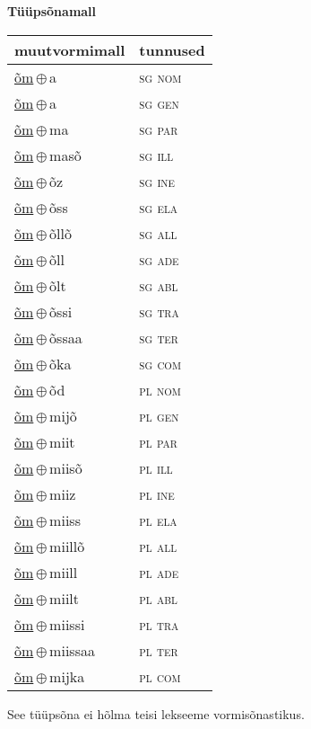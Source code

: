

\vspace{3.5em}
\noindent \begin{minipage}{\textwidth}
\noindent \textbf{Tüüpsõnamall \,}\\

\begin{sideways}
\begin{tabular}{l l}
muutvormimall & tunnused \\
\hline
\underline{õm}\,$\oplus$\,a & \textsc{ sg nom } \\
\underline{õm}\,$\oplus$\,a & \textsc{ sg gen } \\
\underline{õm}\,$\oplus$\,ma & \textsc{ sg par } \\
\underline{õm}\,$\oplus$\,masõ & \textsc{ sg ill } \\
\underline{õm}\,$\oplus$\,õz & \textsc{ sg ine } \\
\underline{õm}\,$\oplus$\,õss & \textsc{ sg ela } \\
\underline{õm}\,$\oplus$\,õllõ & \textsc{ sg all } \\
\underline{õm}\,$\oplus$\,õll & \textsc{ sg ade } \\
\underline{õm}\,$\oplus$\,õlt & \textsc{ sg abl } \\
\underline{õm}\,$\oplus$\,õssi & \textsc{ sg tra } \\
\underline{õm}\,$\oplus$\,õssaa & \textsc{ sg ter } \\
\underline{õm}\,$\oplus$\,õka & \textsc{ sg com } \\
\underline{õm}\,$\oplus$\,õd & \textsc{ pl nom } \\
\underline{õm}\,$\oplus$\,mijõ & \textsc{ pl gen } \\
\underline{õm}\,$\oplus$\,miit & \textsc{ pl par } \\
\underline{õm}\,$\oplus$\,miisõ & \textsc{ pl ill } \\
\underline{õm}\,$\oplus$\,miiz & \textsc{ pl ine } \\
\underline{õm}\,$\oplus$\,miiss & \textsc{ pl ela } \\
\underline{õm}\,$\oplus$\,miillõ & \textsc{ pl all } \\
\underline{õm}\,$\oplus$\,miill & \textsc{ pl ade } \\
\underline{õm}\,$\oplus$\,miilt & \textsc{ pl abl } \\
\underline{õm}\,$\oplus$\,miissi & \textsc{ pl tra } \\
\underline{õm}\,$\oplus$\,miissaa & \textsc{ pl ter } \\
\underline{õm}\,$\oplus$\,mijka & \textsc{ pl com } \\
\end{tabular}
\end{sideways}
\label{tab:tüüpsõnamall-õma}

\end{minipage}

 
\vspace{1em}
\noindent See tüüpsõna ei hõlma teisi lekseeme vormi\-sõnastikus.
